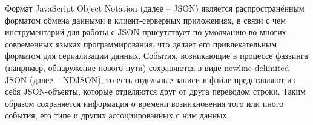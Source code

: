 Формат JavaScript Object Notation (далее -- JSON) является распространённым форматом обмена данными в клиент-серверных приложениях, в связи с чем инструментарий для работы с JSON присутствует по-умолчанию во многих современных языках программирования, что делает его привлекательным форматом для сериализации данных. События, возникающие в процессе фаззинга (например, обнаружение нового пути) сохраняются в виде newline-delimited JSON (далее -- NDJSON), то есть отдельные записи в файле представляют из себя JSON-объекты, которые отделяются друг от друга переводом строки. Таким образом сохраняется информация о времени возникновения того или иного события, его типе и других ассоциированных с ним данных.